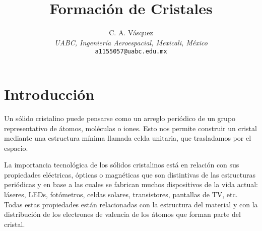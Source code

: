 \documentclass[letterpaper]{article}
\title{\textbf{Formación de Cristales}}
\author{C. A. Vásquez\\
\footnotesize {\textit{UABC, Ingeniería Aeroespacial, Mexicali, México}}\\
\footnotesize \texttt{a1155057@uabc.edu.mx}}
\date{}
\begin{document}
\maketitle

\section*{Introducción}
Un sólido cristalino puede pensarse como un arreglo periódico de un grupo representativo de átomos, moléculas o iones. Esto nos permite construir un cristal mediante una estructura mínima llamada celda unitaria, que trasladamos por el espacio.

La importancia tecnológica de los sólidos cristalinos está en relación con sus propiedades eléctricas, ópticas o magnéticas que son distintivas de las estructuras periódicas y en base a las cuales se fabrican muchos dispositivos de la vida actual: láseres, LEDs, fotómetros, celdas solares, transistores, pantallas de TV, etc. Todas estas propiedades están relacionadas con la estructura del material y con la distribución de los electrones de valencia de los átomos que forman parte del cristal. \supercite{aldebe19}
\end{document}
